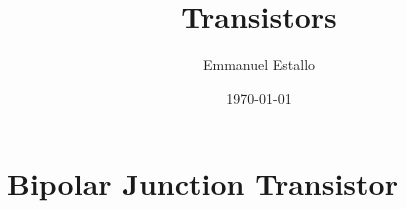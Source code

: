 \documentclass{article}
\title{Transistors}
\author{Emmanuel Estallo}
\date{\today}
\begin{document}
\boldmath 
\maketitle 

\section{Bipolar Junction Transistor}
\end{document}
